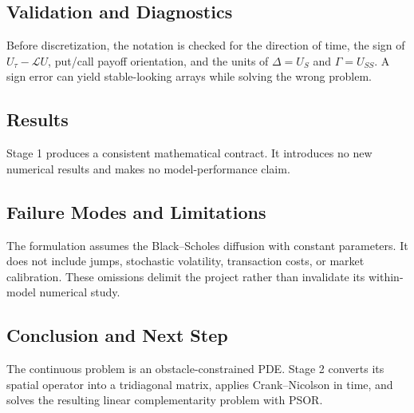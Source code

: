 \subsection{Validation and Diagnostics}
Before discretization, the notation is checked for the direction of time, the
sign of \(U_\tau-\mathcal{L}U\), put/call payoff orientation, and the units of
\(\Delta=U_S\) and \(\Gamma=U_{SS}\). A sign error can yield stable-looking
arrays while solving the wrong problem.

\subsection{Results}
Stage 1 produces a consistent mathematical contract. It introduces no new
numerical results and makes no model-performance claim.

\subsection{Failure Modes and Limitations}
The formulation assumes the Black--Scholes diffusion with constant parameters.
It does not include jumps, stochastic volatility, transaction costs, or market
calibration. These omissions delimit the project rather than invalidate its
within-model numerical study.

\subsection{Conclusion and Next Step}
The continuous problem is an obstacle-constrained PDE. Stage 2 converts its
spatial operator into a tridiagonal matrix, applies Crank--Nicolson in time, and
solves the resulting linear complementarity problem with PSOR.
